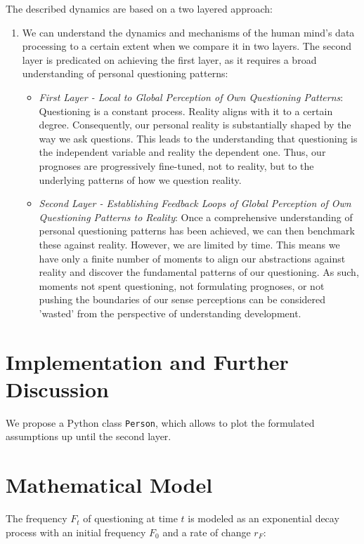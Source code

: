 \documentclass{article}
\begin{document}
    The described dynamics are based on a two layered approach:
    \begin{enumerate}
        \item We can understand the dynamics and mechanisms of the human mind's data processing to a certain extent when we compare it in two layers. The second layer is predicated on achieving the first layer, as it requires a broad understanding of personal questioning patterns:
        \begin{itemize}
            \item \textit{First Layer - Local to Global Perception of Own Questioning Patterns}: Questioning is a constant process. Reality aligns with it to a certain degree. Consequently, our personal reality is substantially shaped by the way we ask questions. This leads to the understanding that questioning is the independent variable and reality the dependent one. Thus, our prognoses are progressively fine-tuned, not to reality, but to the underlying patterns of how we question reality.
            \item \textit{Second Layer - Establishing Feedback Loops of Global Perception of Own Questioning Patterns to Reality}: Once a comprehensive understanding of personal questioning patterns has been achieved, we can then benchmark these against reality. However, we are limited by time. This means we have only a finite number of moments to align our abstractions against reality and discover the fundamental patterns of our questioning. As such, moments not spent questioning, not formulating prognoses, or not pushing the boundaries of our sense perceptions can be considered 'wasted' from the perspective of understanding development.
        \end{itemize}
    \end{enumerate}
    \label{sec:assumptions}


    \section{Implementation and Further Discussion}

    We propose a Python class \texttt{Person}, which allows to plot the formulated assumptions up until the second layer.


    \section{Mathematical Model}

    The frequency $F_t$ of questioning at time $t$ is modeled as an exponential decay process with an initial frequency $F_0$ and a rate of change $r_F$:
\end{document}
